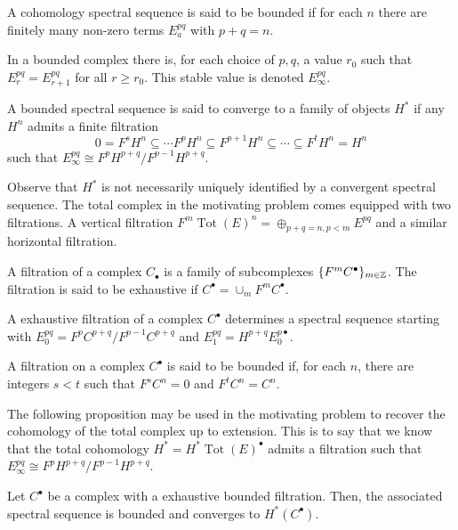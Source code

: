 \begin{definition}
  A cohomology spectral sequence is said to be bounded if for each $n$ there are finitely many non-zero terms $E^{pq}_a$ with $p+q = n$.
\end{definition}
In a bounded complex there is, for each choice of $p,q$, a value $r_0$ such that $E_{r}^{pq}= E_{r+1}^{pq}$ for all $r \geq r_0$. This stable value is denoted $E^{pq}_\infty$.
\begin{definition}
  A bounded spectral sequence is said to converge to a family of objects $H^*$ if any $H^n$ admits a finite filtration
  $$0 = F^s H^n \subseteq \cdots F^p H^n \subseteq F^{p+1}H^n \subseteq \cdots \subseteq F^t H^n = H^n $$
  such that $E^{pq}_\infty \cong F^p H^{p+q} / F^{p-1} H^{p+q}$.
\end{definition}
Observe that $H^*$ is not necessarily uniquely identified by a convergent spectral sequence.
The total complex in the motivating problem comes equipped with two filtrations.
A vertical filtration $F^{m} \operatorname{Tot}(E)^n = \oplus_{p+q = n, p <m} E^{pq}$ and a similar horizontal filtration.
\begin{definition}
  A filtration of a complex $C_\bullet$ is a family of subcomplexes $\{F^m C^\bullet\}_{m\in \mathbb{Z}}$.
  The filtration is said to be exhaustive if $C^\bullet = \cup_m F^mC^\bullet$.
\end{definition}
\begin{proposition}{\cite[Theorem 5.4.1.]{weibel1995introduction}}
 A exhaustive filtration of a complex $C^\bullet$ determines a spectral sequence starting with $E^{pq}_0 = F^p C^{p+q}/F^{p-1}C^{p+q}$ and $E^{pq}_1= H^{p+q} E^{p\bullet}_0$.
\end{proposition}
\begin{definition}
  A filtration on a complex $C^\bullet$ is said to be bounded
 if, for each $n$, there are integers $s<t$ such that $F^s C^n = 0$ and $F^t C^n = C^n$.
\end{definition}
The following proposition may be used in the motivating problem to recover the cohomology of the total complex up to extension.
This is to say that we know that the total cohomology $H^* = H^* \operatorname{Tot}(E)^\bullet$ admits a filtration such that $E^{pq}_\infty \cong F^p H^{p+q}/ F^{p-1} H^{p+q}$.
 \begin{proposition}{\cite[Theorem 5.51.]{weibel1995introduction}}\label{prop: FiltrationSpectral}
   Let $C^\bullet$ be a complex with a exhaustive bounded filtration.
   Then, the associated spectral sequence is bounded and converges to $H^*(C^\bullet)$.
 \end{proposition}
